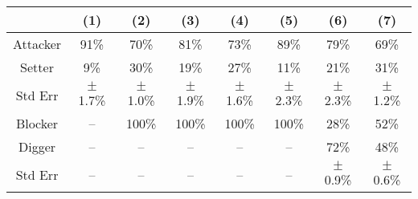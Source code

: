 \begin{tabular}{c|ccccccc}
    &  (1)&  (2)&  (3)&  (4)&  (5)&  (6)&  (7)\\
    \hline
    Attacker  &  91\%       &  70\%       &  81\%       &  73\%       &  89\%       &  79\%       &  69\%\\
    Setter    &  9\%        &  30\%       &  19\%       &  27\%       &  11\%       &  21\%       &  31\%\\
    Std Err   & $\pm$1.7\%  & $\pm$1.0\%  & $\pm$1.9\%  & $\pm$1.6\%  & $\pm$2.3\%  & $\pm$2.3\%  & $\pm$1.2\%\\
    \hline
    Blocker   & --          & 100\%       & 100\%       & 100\%       & 100\%       &  28\%       &  52\%\\
    Digger    & --          & --          & --          & --          & --          &  72\%       &  48\%\\
    Std Err   & --          & --          & --          & --          & --          & $\pm$0.9\%  & $\pm$0.6\%\\
\end{tabular}
